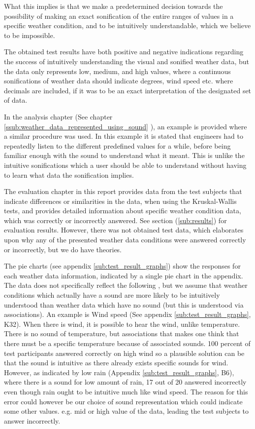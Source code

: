 What this implies is that we make a predetermined decision towards the possibility of making an exact sonification of the entire ranges of values in a specific weather condition, and to be intuitively understandable, which we believe to be impossible.

The obtained test results have both positive and negative indications regarding the success of intuitively understanding the visual and sonified weather data, but the data only represents low, medium, and high values, where a continuous sonifications of weather data should indicate degrees, wind speed etc. where decimals are included, if it was to be an exact interpretation of the designated set of data. 

In the analysis chapter (See chapter \ref{ssub:weather_data_represented_using_sound} ), an example is provided where a similar procedure was used. In this example it is stated that engineers had to repeatedly listen to the different predefined values for a while, before being familiar enough with the sound to understand what it meant. This is unlike the intuitive sonifications which a user should be able to understand without having to learn what data the sonification implies.

The evaluation chapter in this report provides data from the test subjects that indicate differences or similarities in the data, when using the Kruskal-Wallis tests, and provides detailed information about specific weather condition data, which was correctly or incorrectly answered. See section (\ref{sub:results}) for evaluation results. However, there was not obtained test data, which elaborates upon why any of the presented weather data conditions were answered correctly or incorrectly, but we do have theories.


The pie charts (see appendix \ref{sub:test_result_graphs}) show the responses for each weather data information, indicated by a single pie chart in the appendix. The data does not specifically reflect the following , but we assume that weather conditions which actually have a sound are more likely to be intuitively understood than weather data which have no sound (but this is understood via associations). An example is Wind speed (See appendix \ref{sub:test_result_graphs}, K32). When there is wind, it is possible to hear the wind, unlike temperature. There is no sound of temperature, but associations that makes one think that there must be a specific temperature because of associated sounds. 100 percent of test participants answered correctly on high wind so a plausible solution can be that the sound is intuitive as there already exists specific sounds for wind. However, as indicated by low rain (Appendix \ref{sub:test_result_graphs},  B6), where there is a sound for low amount of rain, 17 out of 20 answered incorrectly even though rain ought to be intuitive much like wind speed. The reason for this error could however be our choice of sound representation which could indicate some other values. e.g. mid or high value of the data, leading the test subjects to answer incorrectly.

